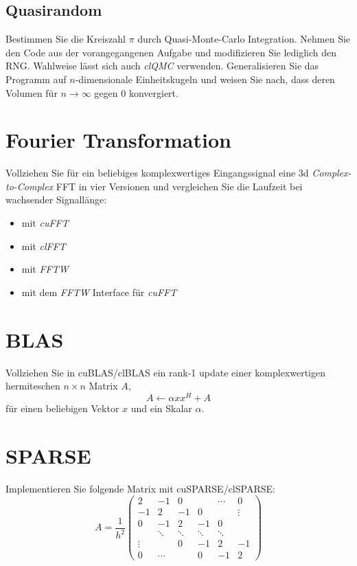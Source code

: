 \documentclass[headsepline=3pt,headinclude=true,12pt,oneside]{scrartcl}
\begin{document}
			\subsection{Quasirandom}
			Bestimmen Sie die Kreiszahl $\pi$ durch Quasi-Monte-Carlo Integration. Nehmen Sie den Code aus der vorangegangenen Aufgabe und modifizieren Sie lediglich den RNG. Wahlweise lässt sich auch \textit{clQMC} verwenden. Generalisieren Sie das Programm auf $n$-dimensionale Einheitskugeln und weisen Sie nach, dass deren Volumen für $n\rightarrow\infty$ gegen 0 konvergiert.
				
		\section{Fourier Transformation}
		Vollziehen Sie für ein beliebiges komplexwertiges Eingangssignal eine 3d \textit{Complex-to-Complex} FFT in vier Versionen und vergleichen Sie die Laufzeit bei wachsender Signallänge:
		\begin{itemize}
			\item mit \textit{cuFFT} 
			\item mit \textit{clFFT}
			\item mit \textit{FFTW}
			\item mit dem \textit{FFTW} Interface für \textit{cuFFT}
		\end{itemize}	
		
		\section{BLAS}
		Vollziehen Sie in cuBLAS/clBLAS ein rank-1 update einer komplexwertigen hermiteschen $n\times n$ Matrix $A$,
		\begin{equation}
			A \leftarrow \alpha xx^H + A
		\end{equation}		 
		für  einen beliebigen Vektor $x$ und ein Skalar $\alpha$.
		
		\section{SPARSE}
		Implementieren Sie folgende Matrix mit cuSPARSE/clSPARSE:
		\begin{equation}
		A = \frac1{h^2} 
		\begin{pmatrix}
			 2      & -1      &  0     &        & \cdots &  0      \\
			-1      &  2      & -1     &  0     &        &  \vdots \\
			 0      & -1      &  2     & -1     &  0     &         \\
			        &  \ddots & \ddots & \ddots & \ddots &         \\
			 \vdots &         &  0     & -1     &  2     & -1      \\
			 0      & \cdots  &        &  0     & -1     &  2
		\end{pmatrix}
		\end{equation}
		
\end{document}
